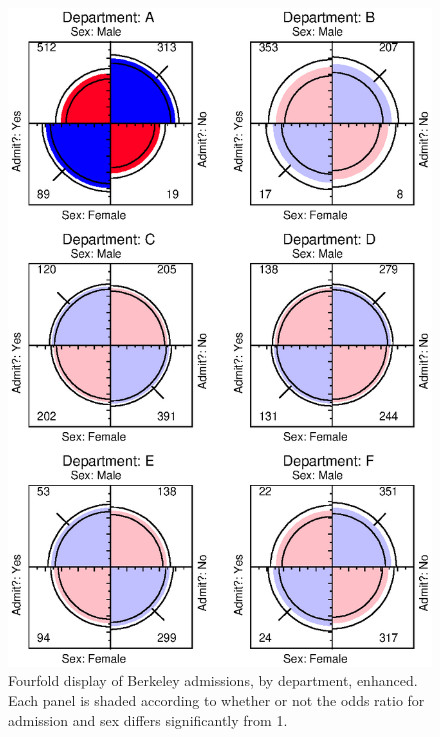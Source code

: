 \begin{figure}[htb]
  \centering
  \includegraphics[scale=.8]{ch3/fig/pie2x2b2}
  \caption[Fourfold display of Berkeley
admissions, by department, enhanced]{Fourfold display of Berkeley
admissions, by department, enhanced.  Each panel is shaded
according to whether or not the odds ratio for admission and sex
differs significantly from 1.}\label{fig:pie2x2b2}
\end{figure}

